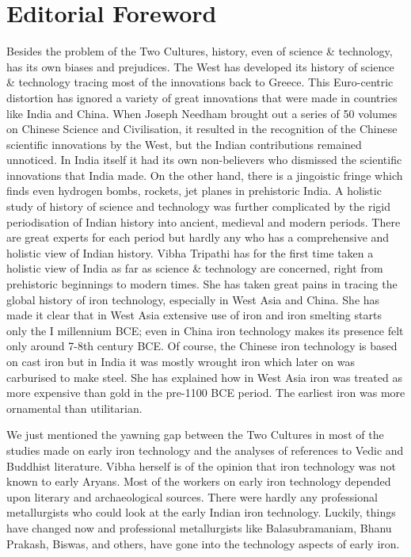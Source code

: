 \chapter*{Editorial Foreword}\label{preface5}

\vspace{-.8cm}

Besides the problem of the Two Cultures, history, even of science \& technology, has its own biases and prejudices. The West has developed its history of science \& technology tracing most of the innovations back to Greece. This Euro-centric distortion has ignored a variety of great innovations that were made in countries like India and China. When Joseph Needham brought out a series of 50 volumes on Chinese Science and Civilisation, it resulted in the recognition of the Chinese scientific innovations by the West, but the Indian contributions remained unnoticed. In India itself it had its own non-believers who dismissed the scientific innovations that India made. On the other hand, there is a jingoistic fringe which finds even hydrogen bombs, rockets, jet planes in prehistoric India. A holistic study of history of science and technology was further complicated by the rigid  periodisation of Indian history into ancient, medieval and modern periods. There are great experts for each period but hardly any who has a comprehensive and holistic view of Indian history.  Vibha Tripathi has for the first time taken a holistic view of India as far as science \& technology are concerned, right from prehistoric beginnings to modern times.  She has taken great pains in tracing the global history of iron technology, especially in West Asia and China. She has made it clear that in West Asia extensive use of iron and iron smelting starts only the I millennium BCE; even in China iron technology makes its presence felt only around 7-8th century BCE. Of course, the Chinese iron technology is based on cast iron but in India it was mostly wrought iron which later on was carburised to make steel. She has explained how in West Asia iron was treated as more expensive than gold in the pre-1100 BCE  period. The earliest iron was more ornamental than utilitarian.

\newpage

We just mentioned the yawning gap between the Two Cultures in most of the studies made on early iron technology and the analyses of references to Vedic and Buddhist literature. Vibha herself is of the opinion that iron technology was not known to early Aryans. Most of the workers on early iron technology depended upon literary and archaeological sources. There were hardly any professional metallurgists who could look at the early Indian iron technology. Luckily, things have changed now and professional metallurgists like Balasubramaniam, Bhanu Prakash, Biswas, and others, have gone into the technology aspects of early iron. 

